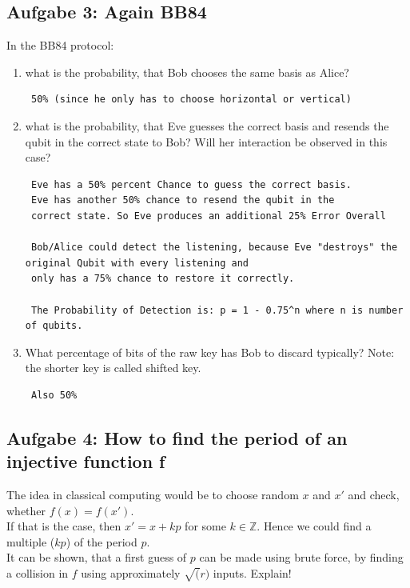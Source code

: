 \documentclass[11pt]{article}
\begin{document}
    \hypertarget{aufgabe-3-again-bb84}{%
\subsection{Aufgabe 3: Again BB84}\label{aufgabe-3-again-bb84}}

In the BB84 protocol:

\begin{enumerate}
\def\labelenumi{\arabic{enumi}.}
\item
  what is the probability, that Bob chooses the same basis as Alice?

\begin{verbatim}
 50% (since he only has to choose horizontal or vertical)
\end{verbatim}
\item
  what is the probability, that Eve guesses the correct basis and
  resends the qubit in the correct state to Bob? Will her interaction be
  observed in this case?

\begin{verbatim}
 Eve has a 50% percent Chance to guess the correct basis.
 Eve has another 50% chance to resend the qubit in the
 correct state. So Eve produces an additional 25% Error Overall

 Bob/Alice could detect the listening, because Eve "destroys" the original Qubit with every listening and
 only has a 75% chance to restore it correctly.

 The Probability of Detection is: p = 1 - 0.75^n where n is number of qubits.
\end{verbatim}
\item
  What percentage of bits of the raw key has Bob to discard typically?
  Note: the shorter key is called shifted key.

\begin{verbatim}
 Also 50%
\end{verbatim}
\end{enumerate}

    \hypertarget{aufgabe-4-how-to-find-the-period-of-an-injective-function-f}{%
\subsection{Aufgabe 4: How to find the period of an injective function
f}\label{aufgabe-4-how-to-find-the-period-of-an-injective-function-f}}

The idea in classical computing would be to choose random \(x\) and
\(x'\) and check, whether \(f (x) = f (x')\).\\
If that is the case, then \(x' = x+kp\) for some \(k \in \mathbb{Z}\).
Hence we could find a multiple (\(kp\)) of the period \(p\).\\
It can be shown, that a first guess of \(p\) can be made using brute
force, by finding a collision in \(f\) using approximately \(\sqrt(r)\)
inputs. Explain!
\end{document}
